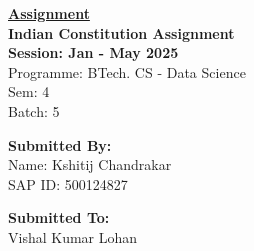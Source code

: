 \documentclass[12pt, letterpaper]{article}
\begin{document}
\centering
{\Huge \underline{\textbf{Assignment}}} \\[0.7cm]
{\Large \textbf{Indian Constitution Assignment}} \\[0.5cm]
{\large \textbf{Session: Jan - May 2025}} \\[0.5cm]  %
{\large Programme: BTech. CS - Data Science} \\[0.5cm]  %
{\large Sem: 4} \\  %
{\large Batch: 5}  %

\vfill
\begin{center}
      \begin{minipage}[t][3cm][t]{0.45\textwidth}  %
        \textbf{Submitted By:} \\[0.15cm]
        Name: Kshitij Chandrakar \\
        SAP ID: 500124827
    \end{minipage}
    \hfill
      \begin{minipage}[t][3cm][t]{0.45\textwidth}  %
        \raggedleft  %
        \textbf{Submitted To:} \\[0.15cm]
        Vishal Kumar Lohan
    \end{minipage}
\end{center}
\end{document}
